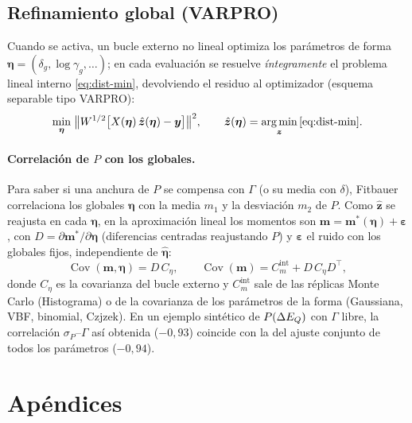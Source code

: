 \subsection{Refinamiento global (VARPRO)}\label{sec:refine}
Cuando se activa, un bucle externo no lineal optimiza los parámetros de forma
$\bm\eta=(\delta_g,\log\gamma_g,\dots)$; en cada evaluación se resuelve
\emph{íntegramente} el problema lineal interno \eqref{eq:dist-min}, devolviendo el
residuo al optimizador (esquema separable tipo VARPRO):
\begin{equation}
  \min_{\bm\eta}\;\bigl\|W^{1/2}\bigl[X(\bm\eta)\,\hat{\bm z}(\bm\eta)-\bm y\bigr]\bigr\|^2,
  \qquad \hat{\bm z}(\bm\eta)=\operatorname*{arg\,min}_{\bm z}\eqref{eq:dist-min}.
\end{equation}

\paragraph{Correlación de $P$ con los globales.} Para saber si una anchura de $P$
se compensa con $\Gamma$ (o su media con $\delta$), Fitbauer correlaciona los
globales $\bm\eta$ con la media $m_1$ y la desviación $m_2$ de $P$. Como $\hat{\bm
z}$ se reajusta en cada $\bm\eta$, en la aproximación lineal los momentos son
$\bm m=\bm m^*(\bm\eta)+\bm\varepsilon$, con $D=\partial\bm m^*/\partial\bm\eta$
(diferencias centradas reajustando $P$) y $\bm\varepsilon$ el ruido con los
globales fijos, independiente de $\hat{\bm\eta}$:
\begin{equation}
  \operatorname{Cov}(\bm m,\bm\eta)=D\,C_\eta,\qquad
  \operatorname{Cov}(\bm m)=C_m^{\text{int}}+D\,C_\eta D^\top,
\end{equation}
donde $C_\eta$ es la covarianza del bucle externo y $C_m^{\text{int}}$ sale de las
réplicas Monte Carlo (Histograma) o de la covarianza de los parámetros de la forma
(Gaussiana, VBF, binomial, Czjzek). En un ejemplo sintético de $P(\Delta E_{Q})$ con
$\Gamma$ libre, la correlación $\sigma_P$--$\Gamma$ así obtenida ($-0{,}93$) coincide
con la del ajuste conjunto de todos los parámetros ($-0{,}94$).


\section{Apéndices}

